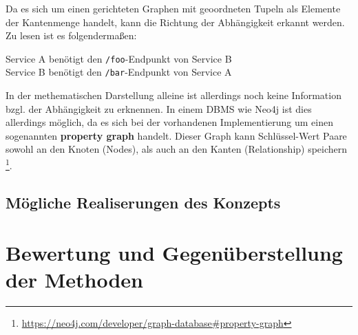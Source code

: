 \documentclass[
	12pt,
	BCOR=5mm,
	DIV=12,
	headinclude=on,
	footinclude=off,
	parskip=half,
	bibliography=totoc,
	listof=entryprefix,
	toc=listof,
	numbers=noenddot,
	plainfootsepline
]{scrreprt}
\begin{document}
Da es sich um einen gerichteten Graphen mit geoordneten Tupeln als Elemente der Kantenmenge handelt, kann die Richtung der Abhängigkeit erkannt werden. Zu lesen ist es folgendermaßen:

\begin{center}
	Service A benötigt den \texttt{/foo}-Endpunkt von Service B\\
	Service B benötigt den \texttt{/bar}-Endpunkt von Service A
\end{center}

In der methematischen Darstellung alleine ist allerdings noch keine Information bzgl. der Abhängigkeit zu erknennen. In einem \ac{DBMS} wie Neo4j ist dies allerdings möglich, da es sich bei der vorhandenen Implementierung um einen sogenannten \textbf{property graph} handelt. Dieser Graph kann Schlüssel-Wert Paare sowohl an den Knoten (Nodes), als auch an den Kanten (Relationship) speichern \footnote{\url{https://neo4j.com/developer/graph-database\#property-graph}}.

\subsection{Mögliche Realiserungen des Konzepts}


\section{Bewertung und Gegenüberstellung der Methoden}
\end{document}
